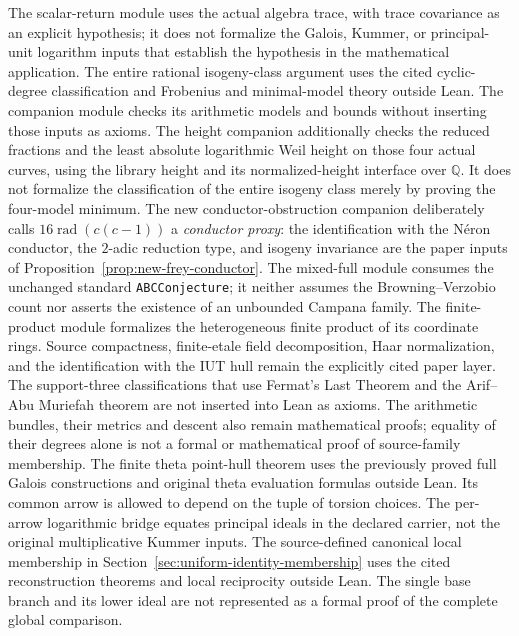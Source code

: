 \documentclass[11pt]{amsart}
\theoremstyle{definition}
\theoremstyle{remark}
\newcommand{\rad}{\operatorname{rad}}
\begin{document}
The scalar-return module uses the actual algebra trace, with trace
covariance as an explicit hypothesis; it does not formalize the Galois,
Kummer, or principal-unit logarithm inputs that establish the hypothesis
in the mathematical application. The entire rational isogeny-class
argument uses the cited cyclic-degree classification and Frobenius and
minimal-model theory outside Lean. The companion module checks its
arithmetic models and bounds without inserting those inputs as axioms.
The height companion additionally checks the reduced fractions and the
least absolute logarithmic Weil height on those four actual curves,
using the library height and its normalized-height interface over
$\mathbb Q$. It does not formalize the classification of the entire
isogeny class merely by proving the four-model minimum.
The new conductor-obstruction companion deliberately calls
$16\rad(c(c-1))$ a \emph{conductor proxy}: the identification with the
N\'eron conductor, the $2$-adic reduction type, and isogeny invariance are
the paper inputs of Proposition~\ref{prop:new-frey-conductor}.
The mixed-full module consumes the unchanged standard
\texttt{ABCConjecture}; it neither assumes the Browning--Verzobio count nor
asserts the existence of an unbounded Campana family.  The finite-product
module formalizes the heterogeneous finite product of its coordinate rings.
Source
compactness, finite-etale field decomposition, Haar normalization, and the
identification with the IUT hull remain the explicitly cited paper layer.
The support-three classifications that use Fermat's Last Theorem and the
Arif--Abu Muriefah theorem are not inserted into Lean as axioms.
The arithmetic bundles, their metrics and descent also remain mathematical
proofs; equality of their degrees alone is not a formal or mathematical
proof of source-family membership.
The finite theta point-hull theorem uses the previously proved full
Galois constructions and original theta evaluation formulas outside Lean.
Its common arrow is allowed to depend on the tuple of torsion choices.
The per-arrow logarithmic bridge equates principal ideals in the
declared carrier, not the original multiplicative Kummer inputs.
The source-defined canonical local membership in
Section~\ref{sec:uniform-identity-membership} uses the cited
reconstruction theorems and local reciprocity outside Lean. The
single base branch and its lower ideal are not represented as a
formal proof of the complete global comparison.
\end{document}
